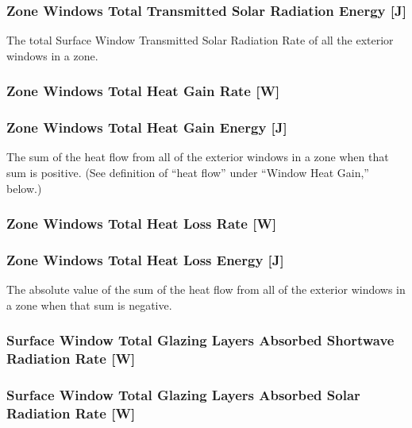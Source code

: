 \subsubsection{Zone Windows Total Transmitted Solar Radiation Energy {[}J{]}}\label{zone-windows-total-transmitted-solar-radiation-energy-j}

The total Surface Window Transmitted Solar Radiation Rate of all the exterior windows in a zone.

\subsubsection{Zone Windows Total Heat Gain Rate {[}W{]}}\label{zone-windows-total-heat-gain-rate-w}

\subsubsection{Zone Windows Total Heat Gain Energy {[}J{]}}\label{zone-windows-total-heat-gain-energy-j}

The sum of the heat flow from all of the exterior windows in a zone when that sum is positive. (See definition of ``heat flow'' under ``Window Heat Gain,'' below.)

\subsubsection{Zone Windows Total Heat Loss Rate {[}W{]}}\label{zone-windows-total-heat-loss-rate-w}

\subsubsection{Zone Windows Total Heat Loss Energy {[}J{]}}\label{zone-windows-total-heat-loss-energy-j}

The absolute value of the sum of the heat flow from all of the exterior windows in a zone when that sum is negative.

\subsubsection{Surface Window Total Glazing Layers Absorbed Shortwave Radiation Rate {[}W{]}}\label{surface-window-total-glazing-layers-absorbed-shortwave-radiation-rate-w}

\subsubsection{Surface Window Total Glazing Layers Absorbed Solar Radiation Rate {[}W{]}}\label{surface-window-total-glazing-layers-absorbed-solar-radiation-rate-w}

